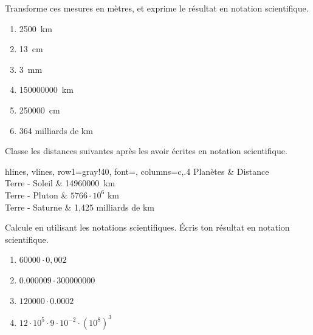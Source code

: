 \documentclass[../../syllabus_2.tex]{subfiles}
\begin{document}
%

\begin{exercise}
	Transforme ces mesures en mètres, et exprime le résultat en notation scientifique.
	\begin{enumerate}[cols=3]
		\item  \SI{2500}{km}
		\item  \SI{13}{cm}
		\item  \SI{3}{mm}
		\item  \SI{150000000}{km}
		\item  \SI{250000}{cm}
		\item  364 milliards de km
	\end{enumerate}
\end{exercise}

\begin{exercise}
	Classe les distances suivantes après les avoir écrites en notation scientifique.
	\begin{center}
		\begin{tblr}{hlines, vlines, row{1}={gray!40, font=\bfseries}, columns={c,.4\linewidth}}
			Planètes        & Distance              \\
			Terre - Soleil  & \SI{14960000}{km}     \\
			Terre - Pluton  & \(5766\cdot 10^6\) km \\
			Terre - Saturne & 1,425 milliards de km \\
		\end{tblr}
	\end{center}
\end{exercise}

\begin{exercise}
	Calcule en utilisant les notations scientifiques. Écris ton résultat en notation scientifique.
	\begin{enumerate}[cols=2]
		\item  \(\num{60000}\cdot 0,002\)
		\item  \(\num{0,000009}\cdot \num{300000000}\)
		\item  \(\num{120000}\cdot \num{0,0002}\)
		\item  \(12\cdot 10^5\cdot 9\cdot 10^{-2}\cdot \left(10^8\right)^3\)
	\end{enumerate}
\end{exercise}
\end{document}

